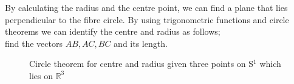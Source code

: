 \documentclass[12pt]{article} %
\begin{document}
\begin{flushleft}
By calculating the radius and the centre point, we can find a plane that lies perpendicular to the fibre circle. By using trigonometric functions and circle theorems we can identify the centre and radius as follows;\\
find the vectors $AB, AC, BC$ and its length.\\
\begin{figure}[H] %
\caption{Circle theorem for centre and radius given three points on S$^{1}$ which lies on $\mathbb{R}^{3}$}
\label{fig:speciation}
\end{figure}


\end{flushleft}
\end{document}
